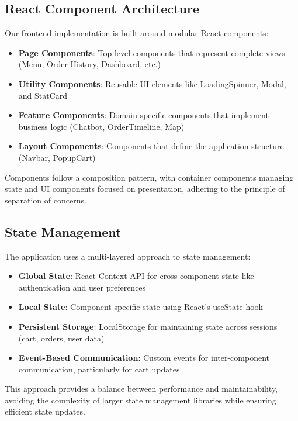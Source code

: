 \documentclass[12pt]{article}
\begin{document}
\subsection{React Component Architecture}

Our frontend implementation is built around modular React components:

\begin{itemize}
    \item \textbf{Page Components}: Top-level components that represent complete views (Menu, Order History, Dashboard, etc.)
    \item \textbf{Utility Components}: Reusable UI elements like LoadingSpinner, Modal, and StatCard
    \item \textbf{Feature Components}: Domain-specific components that implement business logic (Chatbot, OrderTimeline, Map)
    \item \textbf{Layout Components}: Components that define the application structure (Navbar, PopupCart)
\end{itemize}

Components follow a composition pattern, with container components managing state and UI components focused on presentation, adhering to the principle of separation of concerns.

\subsection{State Management}

The application uses a multi-layered approach to state management:

\begin{itemize}
    \item \textbf{Global State}: React Context API for cross-component state like authentication and user preferences
    \item \textbf{Local State}: Component-specific state using React's useState hook
    \item \textbf{Persistent Storage}: LocalStorage for maintaining state across sessions (cart, orders, user data)
    \item \textbf{Event-Based Communication}: Custom events for inter-component communication, particularly for cart updates
\end{itemize}

This approach provides a balance between performance and maintainability, avoiding the complexity of larger state management libraries while ensuring efficient state updates.
\end{document}
